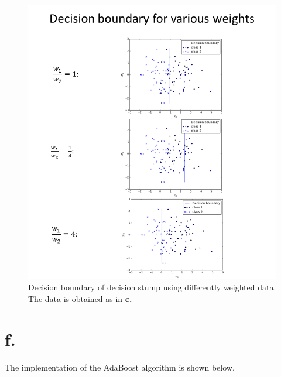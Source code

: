\documentclass [a4paper] {report}
\begin{document}
	\begin{figure}[H]
		\includegraphics[width = \textwidth]{Images/weights.png}
		\caption{Decision boundary of decision stump using differently weighted data. The data is obtained as in \textbf{c.}}
		\label{weights}
	\end{figure}
	\newpage
	\section*{f.}
	The implementation of the AdaBoost algorithm is shown below.
	
\end{document}
